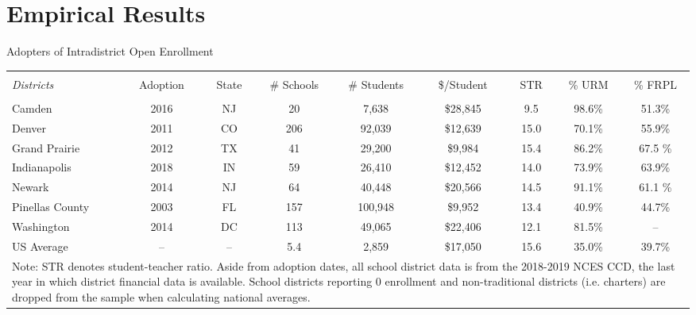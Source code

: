 \documentclass[notes,11pt, aspectratio=169]{beamer}
\begin{document}
\section{Empirical Results}

\begin{frame}{Adopters of Intradistrict Open Enrollment}
\begin{table}[h] \centering 
\renewcommand{\arraystretch}{1.25}
    \label{sumstats} 
  \scriptsize 
  \begin{tabular}{@{\extracolsep{5pt}}lcccccccc} 
  \\[-1.8ex]\hline 
  \hline \\[-1.8ex] 
  \textit{Districts} & Adoption & State & \# Schools & \# Students & \$/Student & STR & \% URM & \% FRPL \\ 
  \hline \\[-1.8ex] 
  Camden & 2016 & NJ & 20 & 7,638 & \$28,845 & 9.5 & 98.6\% & 51.3\% \\
  Denver & 2011 & CO & 206 & 92,039 & \$12,639 & 15.0 & 70.1\% & 55.9\% \\
  Grand Prairie & 2012 & TX & 41 & 29,200 & \$9,984 & 15.4 & 86.2\% & 67.5 \% \\
  Indianapolis & 2018 & IN & 59 & 26,410 & \$12,452 & 14.0 & 73.9\% & 63.9\% \\ 
  Newark & 2014 & NJ & 64 & 40,448 & \$20,566 & 14.5 & 91.1\% & 61.1 \% \\  
  Pinellas County & 2003 & FL & 157 & 100,948 & \$9,952 & 13.4 & 40.9\% & 44.7\% \\  
  Washington & 2014 & DC & 113 & 49,065 & \$22,406 & 12.1 & 81.5\% & -- \\  
  \midrule
  US Average & -- & -- & 5.4 & 2,859 & \$17,050 & 15.6 & 35.0\% & 39.7\% \\  
  \midrule \midrule
  \multicolumn{9}{l}{\parbox{15cm}{Note: STR denotes student-teacher ratio. Aside from adoption dates, all school district data is from the 2018-2019 NCES CCD, the last year in which district financial data is available. School districts reporting 0 enrollment and non-traditional districts (i.e. charters) are dropped from the sample when calculating national averages.}}
  \end{tabular}
  \end{table} 

\end{frame}
\end{document}
